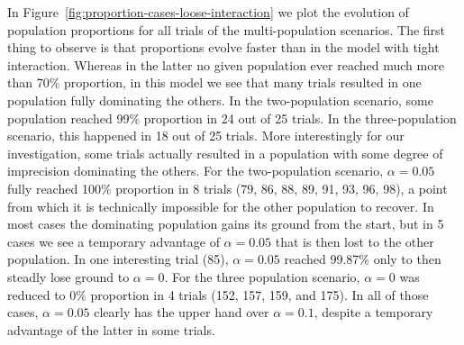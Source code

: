 \documentclass[a4paper]{article}
\begin{document}
In Figure~\ref{fig:proportion-cases-loose-interaction} we plot the evolution of population proportions for all trials of the multi-population scenarios.
The first thing to observe is that proportions evolve faster than in the model with tight interaction.
Whereas in the latter no given population ever reached much more than 70\% proportion, in this model we see that many trials resulted in one population fully dominating the others.
In the two-population scenario, some population reached 99\% proportion in 24 out of 25 trials.
In the three-population scenario, this happened in 18 out of 25 trials.
More interestingly for our investigation, some trials actually resulted in a population with some degree of imprecision dominating the others.
For the two-population scenario, $\alpha = 0.05$ fully reached 100\% proportion in 8 trials (79, 86, 88, 89, 91, 93, 96, 98), a point from which it is technically impossible for the other population to recover.
In most cases the dominating population gains its ground from the start, but in 5 cases we see a temporary advantage of $\alpha = 0.05$ that is then lost to the other population.
In one interesting trial (85), $\alpha = 0.05$ reached 99.87\% only to then steadly lose ground to $\alpha = 0$.
For the three population scenario, $\alpha = 0$ was reduced to 0\% proportion in 4 trials (152, 157, 159, and 175).
In all of those cases, $\alpha = 0.05$ clearly has the upper hand over $\alpha = 0.1$, despite a temporary advantage of the latter in some trials.
\end{document}
